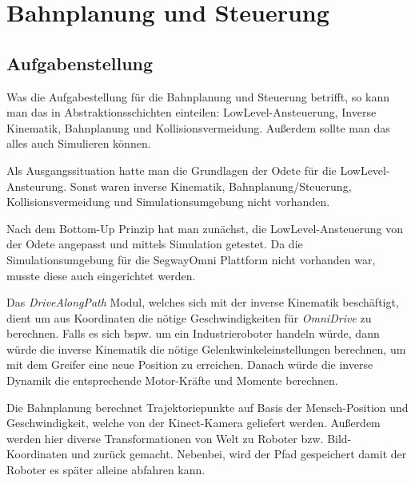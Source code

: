 \chapter{Bahnplanung und Steuerung}
\label{bahnplanung_steuerung_cha}

\section{Aufgabenstellung}
\label{bahnplanung_aufgabenstellung_sec}
\authorsection{\editoroier}

Was die Aufgabestellung für die Bahnplanung und Steuerung betrifft, so kann man das in Abstraktionsschichten einteilen:
LowLevel-Ansteuerung, Inverse Kinematik, Bahnplanung und Kollisionsvermeidung.
Außerdem sollte man das alles auch Simulieren können.

Als Ausgangssituation hatte man die Grundlagen der Odete für die LowLevel-Ansteurung.
Sonst waren inverse Kinematik, Bahnplanung/Steuerung, Kollisionsvermeidung und Simulationsumgebung nicht vorhanden.

Nach dem Bottom-Up Prinzip hat man zunächst, die LowLevel-Ansteuerung von der Odete angepasst und mittels Simulation getestet.
Da die Simulationsumgebung für die SegwayOmni Plattform nicht vorhanden war, musste diese auch eingerichtet werden.

Das \textit{DriveAlongPath} Modul, welches sich mit der inverse Kinematik beschäftigt, dient um aus Koordinaten die nötige Geschwindigkeiten für \textit{OmniDrive} zu berechnen.
Falls es sich bspw. um ein Industrieroboter handeln würde, dann würde die inverse Kinematik die nötige Gelenkwinkeleinstellungen berechnen, um mit dem Greifer eine neue Position zu erreichen.
Danach würde die inverse Dynamik die entsprechende Motor-Kräfte und Momente berechnen.

Die Bahnplanung berechnet Trajektoriepunkte auf Basis der Mensch-Position und Geschwindigkeit, welche von der Kinect-Kamera geliefert werden.
Außerdem werden hier diverse Transformationen von Welt zu Roboter bzw. Bild-Koordinaten und zurück gemacht.
Nebenbei, wird der Pfad gespeichert damit der Roboter es später alleine abfahren kann.


